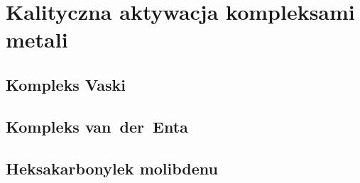 \section{Kalityczna aktywacja kompleksami metali}\label{literature:catalytic}


\subsection{Kompleks Vaski}\label{literature:catalytic:vasca}
\subsection{Kompleks van~der~Enta}\label{literature:catalytic:van-der-ent}
\subsection{Heksakarbonylek molibdenu}\label{literature:catalytic:molydenium}
